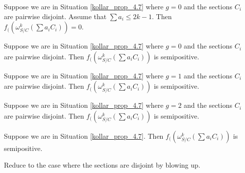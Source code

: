 \begin{lemma}
Suppose we are in Situation \ref{kollar_prop_4.7} where $g=0$ and the sections $C_i$ are pairwise disjoint.
Assume that $\sum a_i\le 2k-1$.
Then $f_{(}(\omega_{S/C}^{k}(\sum a_iC_i))=0$. 
\end{lemma}


\begin{lemma}
Suppose we are in Situation \ref{kollar_prop_4.7} where $g=0$ and the sections $C_i$ are pairwise disjoint.
Then $f_{(}(\omega_{S/C}^{k}(\sum a_iC_i))$ is semipositive.
\end{lemma}

\begin{lemma}
Suppose we are in Situation \ref{kollar_prop_4.7} where $g=1$ and the sections $C_i$ are pairwise disjoint.
Then $f_{(}(\omega_{S/C}^{k}(\sum a_iC_i))$ is semipositive.
\end{lemma}

\begin{lemma}
Suppose we are in Situation \ref{kollar_prop_4.7} where $g=2$ and the sections $C_i$ are pairwise disjoint.
Then $f_{(}(\omega_{S/C}^{k}(\sum a_iC_i))$ is semipositive.
\end{lemma}


\begin{lemma}
Suppose we are in Situation \ref{kollar_prop_4.7}.
Then $f_{(}(\omega_{S/C}^{k}(\sum a_iC_i))$ is semipositive.
\end{lemma}
\begin{lemma}
Reduce to the case where the sections are disjoint by blowing up.
\end{lemma}




